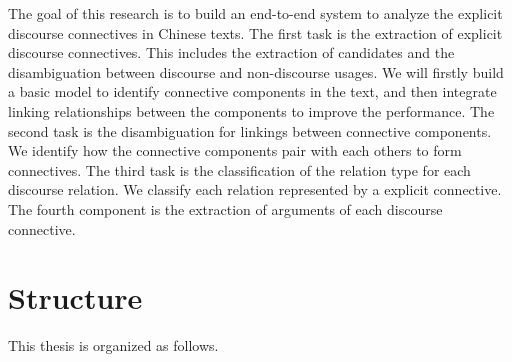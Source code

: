 The goal of this research is to build an end-to-end system to analyze the explicit discourse
connectives in Chinese texts. The first task is the extraction of explicit discourse
connectives. This includes the extraction of candidates and the disambiguation between discourse
and non-discourse usages. We will firstly build a basic model to identify connective components
in the text, and then integrate linking relationships between the components to improve
the performance. The second task is the disambiguation for linkings between connective components.
We identify how the connective components pair with each others to form connectives.
The third task is the classification of the relation type for each discourse relation. We classify
each relation represented by a explicit connective.
The fourth component is the extraction of arguments of each discourse connective.

%
%
\section{Structure}
This thesis is organized as follows.
